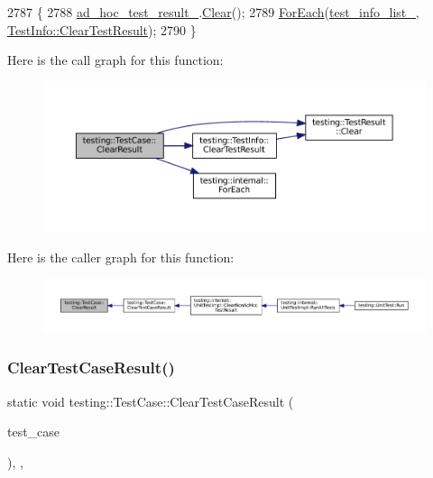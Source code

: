 \begin{DoxyCode}
2787                            \{
2788   \hyperlink{classtesting_1_1TestCase_a4aec85d3398a4a0161f1cde69c07aadc}{ad\_hoc\_test\_result\_}.\hyperlink{classtesting_1_1TestResult_a5371bc2e69435b4cb1fdad9ca81759a6}{Clear}();
2789   \hyperlink{namespacetesting_1_1internal_a52f5504ed65d116201ccb8f99a44fd7e}{ForEach}(\hyperlink{classtesting_1_1TestCase_adce272a48399dd67a7bdd14fa7e99b80}{test\_info\_list\_}, \hyperlink{classtesting_1_1TestInfo_ac6d80865a3e68478aaf167058e6ca5c2}{TestInfo::ClearTestResult});
2790 \}
\end{DoxyCode}
Here is the call graph for this function\+:
\nopagebreak
\begin{figure}[H]
\begin{center}
\leavevmode
\includegraphics[width=350pt]{classtesting_1_1TestCase_a4d0498738f8903130a8d0400932e8b54_cgraph}
\end{center}
\end{figure}
Here is the caller graph for this function\+:
\nopagebreak
\begin{figure}[H]
\begin{center}
\leavevmode
\includegraphics[width=350pt]{classtesting_1_1TestCase_a4d0498738f8903130a8d0400932e8b54_icgraph}
\end{center}
\end{figure}
\mbox{\label{classtesting_1_1TestCase_a1c05fe33863b79b1b1ed19e665a1cea7}} 
\subsubsection{\texorpdfstring{Clear\+Test\+Case\+Result()}{ClearTestCaseResult()}}
{\footnotesize\ttfamily static void testing\+::\+Test\+Case\+::\+Clear\+Test\+Case\+Result (\begin{DoxyParamCaption}\item[{\hyperlink{classtesting_1_1TestCase}{Test\+Case} $\ast$}]{test\+\_\+case }\end{DoxyParamCaption})\hspace{0.3cm}{\ttfamily [inline]}, {\ttfamily [static]}, {\ttfamily [private]}}



